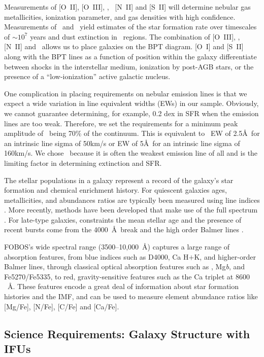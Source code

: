 \documentclass[11pt,a4paper,twoside,onecolumn,openany,final,oldfontcommands]{memoir}
\begin{document}
Measurements of [O~II], [O~III], \Halpha, \Hbeta\, [N~II] and [S~II] will determine nebular gas metallicities, ionization parameter, and gas densities with high confidence. Measurements of \Halpha\ and \Hbeta\ yield estimates of the star formation rate over timescales of $\sim$$10^7$ years and dust extinction in \HII\ regions.  The combination of [O~III], \Hbeta, [N~II] and \Halpha\ allows us to place galaxies on the BPT diagram. [O~I] and [S~II] along with the BPT lines as a function of position within the galaxy differentiate between shocks in the interstellar medium, ionization by post-AGB stars, or the presence of a ``low-ionization'' active galactic nucleus.

One complication in placing requirements on nebular emission lines is that we expect a wide variation in line equivalent widths (EWs) in our sample. Obviously, we cannot guarantee determining, for example, 0.2 dex in SFR when the emission lines are too weak. Therefore, we set the requirements for a minimum peak amplitude of \Hbeta\ being 70\% of the continuum. This is equivalent to \Hbeta\ EW of 2.5\AA\ for an intrinsic line sigma of 50km/s or EW of 5\AA\ for an intrinsic line sigma of 160km/s. We chose \Hbeta\ because it is often the weakest emission line of all and is the limiting factor in determining extinction and SFR.

The stellar populations in a galaxy represent a record of the galaxy's star formation and chemical enrichment history.   For quiescent galaxies ages, metallicities, and abundances ratios are typically been measured using line indices \citep[e.g.][]{johansson12}.  More recently, methods have been developed that make use of the full spectrum \citep{conroy14}.  For late-type galaxies, constraints the mean stellar age and the presence of recent bursts come from the 4000~\AA\ break and the high order Balmer lines \citep[e.g.][]{kauffmann03a}. 

FOBOS's wide spectral range (3500--10,000~\AA) captures a large range of absorption features, from blue indices such as D4000, Ca H$+$K, and higher-order Balmer lines, through classical optical absorption features such as \Hbeta, Mg{\it b}, and Fe5270/Fe5335, to red, gravity-sensitive features such as the Ca triplet at $8600$~\AA. These features encode a great deal of information about star formation histories and the IMF, and can be used to measure element abundance ratios like [Mg/Fe], [N/Fe], [C/Fe] and [Ca/Fe].

\subsection{Science Requirements: Galaxy Structure with IFUs}
\end{document}
